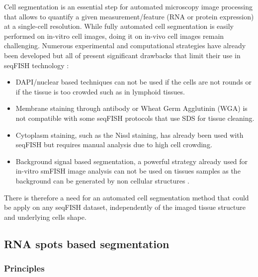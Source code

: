 \documentclass[12pt]{article}
\begin{document}
Cell segmentation is an essential step for automated microscopy image processing that allows to quantify a given measurement/feature (RNA or protein expression) at a single-cell resolution. While fully automated cell segmentation is easily performed on in-vitro cell images, doing it on in-vivo cell images remain challenging. 
Numerous  experimental and computational strategies have already been developed but all of present significant drawbacks that limit their use in seqFISH technology :
\begin{itemize}
\item DAPI/nuclear based techniques can not be used if the cells are not rounds or if the tissue is too crowded such as in lymphoid tissues.
\item Membrane staining through antibody or Wheat Germ Agglutinin (WGA) is not compatible with some seqFISH protocols that use SDS for tissue cleaning.
\item Cytoplasm staining, such as the Nissl staining, has already been used with seqFISH \citep{shah_situ_2016} but requires manual analysis due to high cell crowding. 
\item Background signal based segmentation, a powerful strategy already used for in-vitro smFISH image analysis can not be used on tissues samples as the background can be generated by non cellular structures \citep{mueller_fish-quant:_2013}.
\end{itemize}

There is therefore a need for an automated cell segmentation method that could be apply on any seqFISH dataset, independently of the imaged tissue structure and underlying cells shape. 

\subsection{RNA spots based segmentation}


\subsubsection{Principles}
\end{document}
